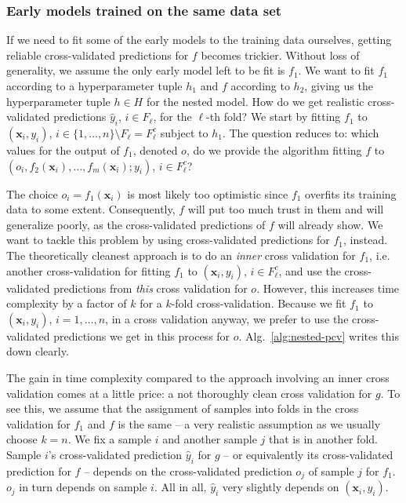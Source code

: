 \subsubsection{Early models trained on the same data set}
If we need to fit some of the early models to the training data ourselves, getting reliable 
cross-validated predictions
for $f$ becomes trickier. Without loss of generality, we assume the only early model left to be fit 
is $f_1$. We want to fit $f_1$ according to a hyperparameter tuple $h_1$ and $f$ according to $h_2$, 
giving us the hyperparameter tuple $h \in H$ for the nested model. How do 
we get realistic cross-validated predictions $\hat{y}_i$, $i \in F_\ell$, for the $\ell$-th fold? 
We start by fitting $f_1$ to $(\mathbf{x}_i, y_i)$, $i \in \{ 1, \ldots, n \} \setminus F_\ell = F_\ell^c$ 
subject to $h_1$.
The question reduces to: which values for the output of $f_1$, denoted $o$, do we provide the 
algorithm fitting $f$ to $(o_i, f_2(\mathbf{x}_i), \dots, f_m(\mathbf{x}_i); y_i)$, $i \in F_\ell^c$?

The choice $o_i = f_1(\mathbf{x}_i)$ is most likely too optimistic since $f_1$ overfits its training 
data to some extent. Consequently, $f$ will put too much trust in them and will generalize poorly, 
as the cross-validated predictions of $f$ will already show. We want to tackle this problem by 
using cross-validated predictions for $f_1$, instead. The theoretically cleanest approach 
is to do an \textit{inner} cross validation for $f_1$, i.e. another cross-validation for fitting 
$f_1$ to $(\mathbf{x}_i, y_i)$, $i \in F_\ell^c$, and use the cross-validated predictions from \textit{this} 
cross validation for $o$. However, this increases time complexity by a factor of $k$ for a $k$-fold 
cross-validation. Because we fit $f_1$ to $(\mathbf{x}_i, y_i)$, $i = 1, \ldots, n$, in a cross validation 
anyway, we prefer to use the cross-validated predictions we get in this process for $o$. 
Alg.\ \ref{alg:nested-pcv} writes this down clearly.



The gain in time complexity compared to the approach involving an inner cross validation comes at a 
little price: a not thoroughly clean cross validation for $g$. To see this, we assume that the 
assignment of samples into folds in the cross validation for $f_1$ and $f$ is the same -- a very 
realistic assumption as we 
usually choose $k = n$. We fix a sample $i$ and another sample $j$ that is in another fold. 
Sample $i$'s cross-validated prediction $\hat{y}_i$ for $g$ -- or equivalently its cross-validated 
prediction for $f$ -- depends on the cross-validated 
prediction $o_j$ of sample $j$ for $f_1$. $o_j$ in turn depends on sample 
$i$. All in all, $\hat{y}_i$ very slightly depends on $(\mathbf{x}_i, y_i)$.

